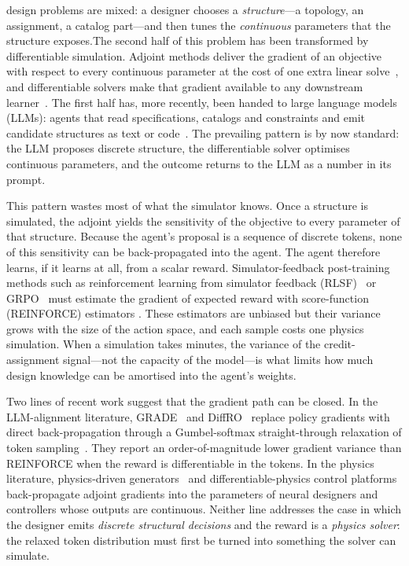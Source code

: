 \documentclass[journal]{IEEEtran}
\newif\ifblindreview
\begin{document}
 design problems are mixed: a designer chooses a
\emph{structure}---a topology, an assignment, a catalog part---and then tunes
the \emph{continuous} parameters that the structure exposes.\ifblindreview\footnote{A conference version of parts of this work exists under the blinded citation~\cite{li2026dctwin}.}\fi  The second half
of this problem has been transformed by differentiable simulation.  Adjoint
methods deliver the gradient of an objective with respect to every continuous
parameter at the cost of one extra linear solve~\cite{giles2000adjoint}, and
differentiable solvers make that gradient available to any downstream
learner~\cite{hu2020difftaichi}.  The first half has,
more recently, been handed to large language models (LLMs): agents that read
specifications, catalogs and constraints and emit candidate structures as
text or code~\cite{ma2024sga,jadhav2026mechdesigner,phythesis2025}.  The prevailing pattern is by now standard: the LLM proposes discrete
structure, the differentiable solver optimises continuous parameters, and the
outcome returns to the LLM as a number in its prompt.

This pattern wastes most of what the simulator knows.  Once a structure is simulated, the adjoint yields the sensitivity of the objective to
every parameter of that structure.  Because the agent's proposal is a sequence of
discrete tokens, none of this sensitivity can be back-propagated into the agent.  The agent therefore learns, if it learns at all, from a scalar reward.
Simulator-feedback post-training methods such as reinforcement learning from
simulator feedback (RLSF)~\cite{scidesignbench2026} or
GRPO~\cite{shao2024grpo} must estimate the gradient of expected reward with
score-function (REINFORCE) estimators
\cite{williams1992reinforce,mohamed2020mcgrad}.  These estimators are
unbiased but their variance grows with the size of the action space, and each
sample costs one physics simulation.  When a simulation takes minutes, the
variance of the credit-assignment signal---not the capacity of the model---is
what limits how much design knowledge can be amortised into the agent's
weights.

Two lines of recent work suggest that the gradient path can be closed.  In
the LLM-alignment literature, GRADE~\cite{grade2026} and DiffRO~\cite{diffro2025}
replace policy gradients with direct back-propagation through a
Gumbel-softmax straight-through relaxation of token sampling~\cite{jang2017gumbel,maddison2017concrete,bengio2013ste}.  They report an order-of-magnitude lower gradient variance than REINFORCE when
the reward is differentiable in the tokens.  In the physics literature,
physics-driven generators~\cite{jiang2019glonet} and differentiable-physics
control platforms back-propagate adjoint
gradients into the parameters of neural designers and controllers whose
outputs are continuous.  Neither line addresses the case in which the
designer emits \emph{discrete structural decisions} and the reward is a
\emph{physics solver}: the relaxed token distribution must first be turned
into something the solver can simulate.
\end{document}
